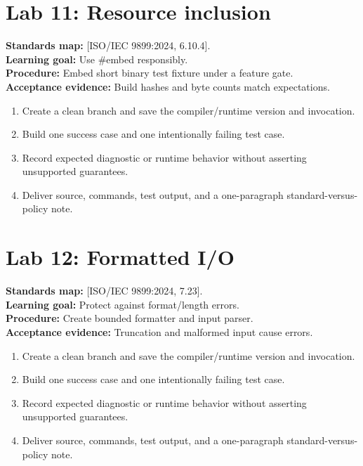 \documentclass[10pt,letterpaper,oneside]{report}
\newcommand{\refcl}[1]{\textsf{\footnotesize[ISO/IEC 9899:2024, #1]}}
\begin{document}
\section{Lab 11: Resource inclusion}
\textbf{Standards map:} \refcl{6.10.4}.\\
\textbf{Learning goal:} Use \#embed responsibly.\\
\textbf{Procedure:} Embed short binary test fixture under a feature gate.\\
\textbf{Acceptance evidence:} Build hashes and byte counts match expectations.
\begin{enumerate}
\item Create a clean branch and save the compiler/runtime version and invocation.
\item Build one success case and one intentionally failing test case.
\item Record expected diagnostic or runtime behavior without asserting unsupported guarantees.
\item Deliver source, commands, test output, and a one-paragraph standard-versus-policy note.
\end{enumerate}

\section{Lab 12: Formatted I/O}
\textbf{Standards map:} \refcl{7.23}.\\
\textbf{Learning goal:} Protect against format/length errors.\\
\textbf{Procedure:} Create bounded formatter and input parser.\\
\textbf{Acceptance evidence:} Truncation and malformed input cause errors.
\begin{enumerate}
\item Create a clean branch and save the compiler/runtime version and invocation.
\item Build one success case and one intentionally failing test case.
\item Record expected diagnostic or runtime behavior without asserting unsupported guarantees.
\item Deliver source, commands, test output, and a one-paragraph standard-versus-policy note.
\end{enumerate}
\end{document}
